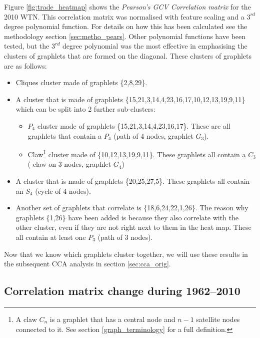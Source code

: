 Figure \ref{fig:trade_heatmap} shows the \emph{Pearson's GCV Correlation matrix} for the 2010 WTN. This correlation matrix was normalised with feature scaling and a $3^{rd}$ degree polynomial function. For details on how this has been calculated see the methodology section \ref{sec:metho_pears}. Other polynomial functions have been tested, but the $3^{rd}$ degree polynomial was the most effective in emphasising the clusters of graphlets that are formed on the diagonal. These clusters of graphlets are as follows:
\begin{itemize}
 \item Cliques cluster made of graphlets \{2,8,29\}.
 \item A cluster that is made of graphlets \{15,21,3,14,4,23,16,17,10,12,13,19,9,11\} which can be split into 2 further sub-clusters: 
    \begin{itemize}
     \item $P_4$ cluster made of graphlets \{15,21,3,14,4,23,16,17\}. These are all 
     graphlets that contain a $P_4$ (path of 4 nodes, graphlet $G_3$). 
     \item Claw\footnote{A claw $C_n$ is a graphlet that has a central node and $n-1$ satellite nodes connected to it. See section \ref{graph_terminology} for a full definition.} cluster made of \{10,12,13,19,9,11\}. These graphlets all contain a $C_3$ ( claw on 3 nodes, graphlet $G_4$)
    \end{itemize}
 \item A cluster that is made of graphlets \{20,25,27,5\}. These graphlets all contain an $S_4$ (cycle of 4 nodes).   
 \item Another set of graphlets that correlate is \{18,6,24,22,1,26\}. The reason why graphlets \{1,26\} have been added is because they also correlate with the other cluster, even if they are not right next to them in the heat map. These all contain at least one $P_3$ (path of 3 nodes).
\end{itemize}

Now that we know which graphlets cluster together, we will use these results in the subsequent CCA analysis in section \ref{sec:cca_orig}.

\subsection{Correlation matrix change during 1962--2010}
\label{trade_change_orig}

